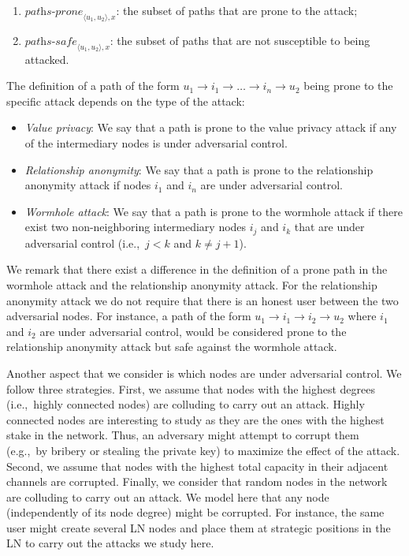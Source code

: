 \begin{enumerate}
	\item $\textit{paths-prone}_{\langle u_1, u_2 \rangle, x}$: the subset of paths that are prone to the attack;
	\item $\textit{paths-safe}_{\langle u_1, u_2 \rangle, x}$: the subset of paths that are not susceptible to being attacked.
\end{enumerate}

The definition of a path of the form $u_1 \rightarrow i_1 \rightarrow \ldots \rightarrow i_n \rightarrow u_2$ being prone to the specific attack depends on the type of the attack:

\begin{itemize}
	\item \textit{Value privacy}: We say that a path is prone to the value privacy attack if any of the intermediary nodes is under adversarial control.
	
	\item \textit{Relationship anonymity}: We say that a path is prone to the relationship anonymity attack if nodes $i_1$ and $i_n$ are under adversarial control.
	
	\item \textit{Wormhole attack}: We say that a path is prone to the wormhole attack if there exist two non-neighboring intermediary 
	nodes $i_j$ and $i_k$ that are under adversarial control (i.e.,~$j < k$ and $k \neq j + 1$).
\end{itemize}

We remark that there exist a difference in the definition of a prone path in the wormhole attack and the relationship anonymity attack.
For the relationship anonymity attack we do not require that there is an honest user between the two adversarial nodes.
For instance, a path of the form $u_1 \rightarrow i_1 \rightarrow i_2 \rightarrow u_2$ where $i_1$ and $i_2$ are under adversarial control, would be considered prone to the relationship anonymity attack but safe against the wormhole attack.

Another aspect that we consider is which nodes are under adversarial control.
We follow three strategies.
First, we assume that nodes with the highest degrees (i.e.,~highly connected nodes) are colluding to carry out an attack.
Highly connected nodes are interesting to study as they are the ones with the highest stake in the network.
Thus, an adversary might attempt to corrupt them (e.g.,~by bribery or stealing the private key) to maximize the effect of the attack.
Second, we assume that nodes with the highest total capacity in their adjacent channels are corrupted.
Finally, we consider that random nodes in the network are colluding to carry out an attack.
We model here that any node (independently of its node degree) might be corrupted.
For instance, the same user might create several LN nodes and place them at strategic positions in the LN to carry out the attacks we study here.


